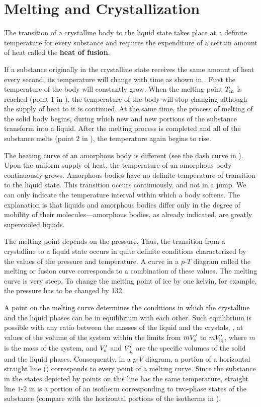 \section{Melting and Crystallization}\label{sec:15_6}

The transition of a crystalline body to the liquid state takes place at a definite temperature for every substance and requires the expenditure of a certain amount of heat called the \textbf{heat of fusion}.

If a substance originally in the crystalline state receives the same amount of heat every second, its temperature will change with time as shown in . First the temperature of the body will constantly grow. When the melting point $T_{\text{m}}$ is reached (point $1$ in ), the temperature of the body will stop changing although the supply of heat to it is continued. At the same time, the process of melting of the solid body begins, during which new and new portions of the substance transform into a liquid. After the melting process is completed and all of the substance melts (point $2$ in ), the temperature again begins to rise.

The heating curve of an amorphous body is different (see the dash curve in ). Upon the uniform supply of heat, the temperature of an amorphous body continuously grows. Amorphous bodies have no definite temperature of transition to the liquid state. This transition occurs continuously, and not in a jump. We can only indicate the temperature interval within which a body softens. The explanation is that liquids and amorphous bodies differ only in the degree of mobility of their molecules---amorphous bodies, as already indicated, are greatly supercooled liquids.

The melting point depends on the pressure. Thus, the transition from a crystalline to a liquid state occurs in quite definite conditions characterized by the values of the pressure and temperature. A curve in a $p$-$T$ diagram called the melting or fusion curve corresponds to a combination of these values. The melting curve is very steep. To change the melting point of ice by one kelvin, for example, the pressure has to be changed by \SI{132}{\atm}.

A point on the melting curve determines the conditions in which the crystalline and the liquid phases can be in equilibrium with each other. Such equilibrium is possible with any ratio between the masses of the liquid and the crystals, \ie, at values of the volume of the system within the limits from $mV_{\text{s}}'$ to $mV_{\text{lq}}'$, where $m$ is the mass of the system, and $V_{\text{s}}'$ and $V_{\text{lq}}'$ are the specific volumes of the solid and the liquid phases. Consequently, in a $p$-$V$ diagram, a portion of a horizontal straight line () corresponds to every point of a melting curve. Since the substance in the states depicted by points on this line has the same temperature, straight line $1$-$2$ in  is a portion of an isotherm corresponding to two-phase states of the substance (compare with the horizontal portions of the isotherms in ).

